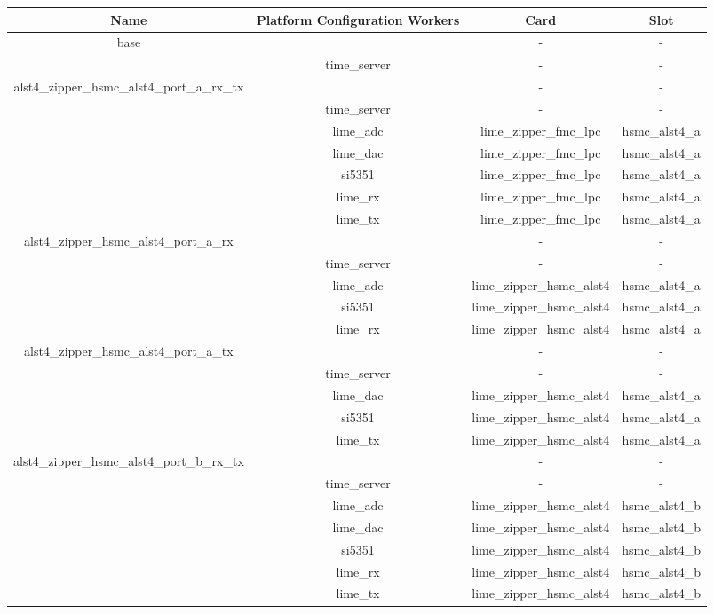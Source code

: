\begin{tabular}{|c|c|c|c|}
	\hline
	\rowcolor{blue}
	Name & Platform Configuration Workers & Card & Slot \\
	\hline
	\multirow{2}{*}{base} &\comp & - & - \\ &time\_server & - & - \\
	\hline
	\multirow{5}{*}{alst4\_zipper\_hsmc\_alst4\_port\_a\_rx\_tx}&
	\comp & - & - \\ &time\_server & - & -
	\\ &lime\_adc & lime\_zipper\_fmc\_lpc & hsmc\_alst4\_a \\
	&lime\_dac & lime\_zipper\_fmc\_lpc & hsmc\_alst4\_a \\
	&si5351 & lime\_zipper\_fmc\_lpc & hsmc\_alst4\_a \\
	&lime\_rx & lime\_zipper\_fmc\_lpc & hsmc\_alst4\_a \\
	&lime\_tx & lime\_zipper\_fmc\_lpc & hsmc\_alst4\_a \\
	\hline
	\multirow{5}{*}{alst4\_zipper\_hsmc\_alst4\_port\_a\_rx}&
	\comp & - & - \\ &time\_server & - & - \\ &lime\_adc &
	lime\_zipper\_hsmc\_alst4 & hsmc\_alst4\_a \\  &si5351 &
	lime\_zipper\_hsmc\_alst4 & hsmc\_alst4\_a \\ &lime\_rx &
	lime\_zipper\_hsmc\_alst4 & hsmc\_alst4\_a \\
	\hline
	\multirow{5}{*}{alst4\_zipper\_hsmc\_alst4\_port\_a\_tx}&
	\comp & - & - \\ &time\_server & - & - \\ &lime\_dac &
	lime\_zipper\_hsmc\_alst4 & hsmc\_alst4\_a \\  &si5351 &
	lime\_zipper\_hsmc\_alst4 & hsmc\_alst4\_a \\ &lime\_tx &
	lime\_zipper\_hsmc\_alst4 & hsmc\_alst4\_a \\
	\hline
	\multirow{5}{*}{alst4\_zipper\_hsmc\_alst4\_port\_b\_rx\_tx}&
	\comp & - & - \\ &time\_server & - & - \\ &lime\_adc &
	lime\_zipper\_hsmc\_alst4 & hsmc\_alst4\_b \\ &lime\_dac &
	lime\_zipper\_hsmc\_alst4 & hsmc\_alst4\_b \\ &si5351 &
	lime\_zipper\_hsmc\_alst4 & hsmc\_alst4\_b \\ &lime\_rx &
	lime\_zipper\_hsmc\_alst4 & hsmc\_alst4\_b \\ &lime\_tx &
	lime\_zipper\_hsmc\_alst4 & hsmc\_alst4\_b \\

\end{tabular}
